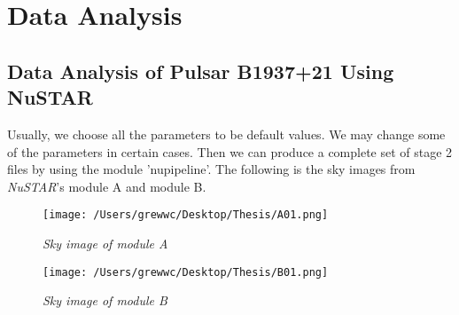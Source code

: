 \documentclass[12pt]{report}
\begin{document}
\chapter{Data Analysis}
    
    
    \section{Data Analysis of Pulsar B1937+21 Using NuSTAR}
        Usually, we choose all the parameters to be default values. We may change some of the parameters in certain 
        cases. 
        Then we can produce a complete set of stage 2 files by using the module 'nupipeline'. The following is 
        the sky images from \textit{NuSTAR}'s module A and module B. 
        \begin{figure}[h]
          \hspace{0.7cm}
          \begin{minipage}{0.45\textwidth} 
            \centering 
            \texttt{[image: /Users/grewwc/Desktop/Thesis/A01.png]}
            \caption{\textit{\footnotesize Sky image of module A}}
          \end{minipage}
          \hspace{0.1cm} 
          \begin{minipage}{0.52\textwidth}
            \centering 
            \texttt{[image: /Users/grewwc/Desktop/Thesis/B01.png]}
            \caption{\textit{\footnotesize Sky image of module B}}
          \end{minipage}
        \end{figure}
      
\end{document}
